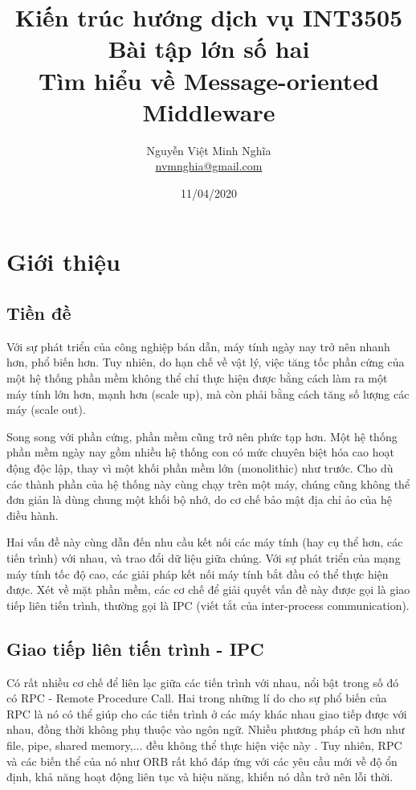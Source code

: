 \documentclass{article}
\author{Nguyễn Việt Minh Nghĩa \\ \href{mailto:nvmnghia@gmail.com}{nvmnghia@gmail.com}}
\date{11/04/2020}
\title{Kiến trúc hướng dịch vụ INT3505 \\ Bài tập lớn số hai \\ Tìm hiểu về Message-oriented Middleware}
\begin{document}
\maketitle

\section{Giới thiệu}

\subsection{Tiền đề}

Với sự phát triển của công nghiệp bán dẫn, máy tính ngày nay trở nên nhanh hơn,
phổ biến hơn. Tuy nhiên, do hạn chế về vật lý, việc tăng tốc phần cứng của một
hệ thống phần mềm không thể chỉ thực hiện được bằng cách làm ra một máy tính lớn
hơn, mạnh hơn (scale up), mà còn phải bằng cách tăng số lượng các máy (scale
out).

Song song với phần cứng, phần mềm cũng trở nên phức tạp hơn. Một hệ thống phần
mềm ngày nay gồm nhiều hệ thống con có mức chuyên biệt hóa cao hoạt động độc
lập, thay vì một khối phần mềm lớn (monolithic) như trước. Cho dù các thành phần
của hệ thống này cùng chạy trên một máy, chúng cũng không thể đơn giản là dùng
chung một khối bộ nhớ, do cơ chế bảo mật địa chỉ ảo của hệ điều hành.

Hai vấn đề này cùng dẫn đến nhu cầu kết nối các máy tính (hay cụ thể hơn, các
tiến trình) với nhau, và trao đổi dữ liệu giữa chúng. Với sự phát triển của mạng
máy tính tốc độ cao, các giải pháp kết nối máy tính bắt đầu có thể thực hiện
được. Xét về mặt phần mềm, các cơ chế để giải quyết vấn đề này được gọi là giao
tiếp liên tiến trình, thường gọi là IPC (viết tắt của inter-process
communication).

\subsection{Giao tiếp liên tiến trình - IPC}

Có rất nhiều cơ chế để liên lạc giữa các tiến trình với nhau, nổi bật trong số
đó có RPC - Remote Procedure Call. Hai trong những lí do cho sự phổ biến của RPC
là nó có thể giúp cho các tiến trình ở các máy khác nhau giao tiếp được với
nhau, đồng thời không phụ thuộc vào ngôn ngữ. Nhiều phương pháp cũ hơn như file,
pipe, shared memory,... đều không thể thực hiện việc này \cite{osc12}. Tuy
nhiên, RPC và các biến thể của nó như ORB rất khó đáp ứng với các yêu cầu mới về
độ ổn định, khả năng hoạt động liên tục và hiệu năng, khiến nó dần trở nên lỗi
thời.
\end{document}
